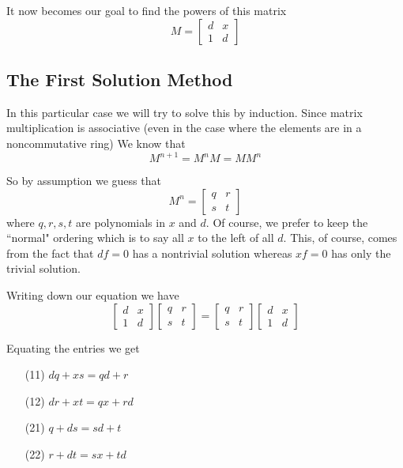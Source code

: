 \documentclass{amsart}
\theoremstyle{definition}
\theoremstyle{remark}
\numberwithin{equation}{section}
\begin{document}
It now becomes our goal to find the powers of this matrix
\[
M= \begin{bmatrix}
d & x\\1 & d
\end{bmatrix}
\]

\subsection{The First Solution Method}

In this particular case we will try to solve this by induction.  Since matrix multiplication is associative (even in the case where the elements are in a noncommutative ring) We know that
\[
M^{n+1} = M^n M = M M^n
\]

So by assumption we guess that 
\[
M^n = \begin{bmatrix}
q & r\\
s & t
\end{bmatrix}
\]
where $q,r,s,t$ are polynomials in $x$ and $d$.  Of course, we prefer to keep the ``normal" ordering which is to say all $x$ to the left of all $d$. This, of course, comes from the fact that $df = 0$ has a nontrivial solution whereas $xf=0$ has only the trivial solution.

Writing down our equation we have
\[
\begin{bmatrix}
d & x\\
1 & d
\end{bmatrix} 
\begin{bmatrix}
q & r\\
s & t
\end{bmatrix}=
\begin{bmatrix}
q & r\\
s & t
\end{bmatrix}
\begin{bmatrix}
d & x\\
1 & d
\end{bmatrix} 
\]


Equating the entries we get
\begin{itemize}
\item[(11)] $dq + xs = qd + r$\\
\item[(12)] $dr + xt = qx + rd$\\
\item[(21)] $q + ds = sd + t$\\
\item[(22)] $r + dt = sx + td$
\end{itemize}
\end{document}
